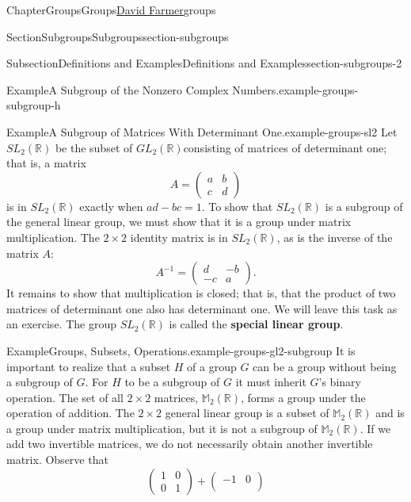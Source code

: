 \documentclass[oneside,10pt,]{book}
\newcommand{\terminology}[1]{\textbf{#1}}
\numberwithin{equation}{section}
\begin{document}
\begin{chapterptx}{Chapter}{Groups}{}{Groups}{\hyperlink{dfarmer}{David Farmer}}{}{groups}
\begin{sectionptx}{Section}{Subgroups}{}{Subgroups}{}{}{section-subgroups}
\begin{subsectionptx}{Subsection}{Definitions and Examples}{}{Definitions and Examples}{}{}{section-subgroups-2}
\begin{example}{Example}{A Subgroup of the Nonzero Complex Numbers.}{example-groups-subgroup-h}
\end{example}
\begin{example}{Example}{A Subgroup of Matrices With Determinant One.}{example-groups-sl2}%
Let \(SL_2( {\mathbb R})\) be the subset of \(GL_2( {\mathbb R })\)consisting of matrices of determinant one; that is, a matrix \label{example-groups-sl2-2-3}%
\begin{equation*}
A =
\begin{pmatrix}
a & b \\
c & d
\end{pmatrix}
\end{equation*}
is in \(SL_2( {\mathbb R})\) exactly when \(ad - bc = 1\). To show that \(SL_2( {\mathbb R})\) is a subgroup of the general linear group, we must show that it is a group under matrix multiplication.  The \(2 \times 2\) identity matrix is in \(SL_2( {\mathbb R})\), as is the inverse of the matrix \(A\):%
\begin{equation*}
A^{-1} =
\begin{pmatrix}
d  & -b \\
-c &  a
\end{pmatrix}\text{.}
\end{equation*}
It remains to show that multiplication is closed; that is, that the product of two matrices of determinant one also has determinant one. We will leave this task as an exercise. The group \(SL_2({\mathbb R})\) is called the \terminology{special linear group}.%
\end{example}
\begin{example}{Example}{Groups, Subsets, Operations.}{example-groups-gl2-subgroup}%
It is important to realize that a subset \(H\) of a group \(G\) can be a group without being a subgroup of \(G\). For \(H\) to be a subgroup of \(G\) it must inherit \(G\)'s binary operation.  The set of all \(2 \times 2\) matrices, \({\mathbb M}_2(\mathbb R)\), forms a group under the operation of addition. The \(2 \times 2\) general linear group is a subset of \({\mathbb M}_2(\mathbb R)\) and is a group under matrix multiplication, but it is not a subgroup of \({\mathbb M}_2(\mathbb R)\).  If we add two invertible matrices, we do not necessarily obtain another invertible matrix. Observe that%
\begin{equation*}
\begin{pmatrix}
1 & 0 \\
0 & 1
\end{pmatrix}
+
\begin{pmatrix}
-1 &  0 \\

\end{pmatrix}
\end{equation*}
\end{example}
\end{subsectionptx}
\end{sectionptx}
\end{chapterptx}
\end{document}
